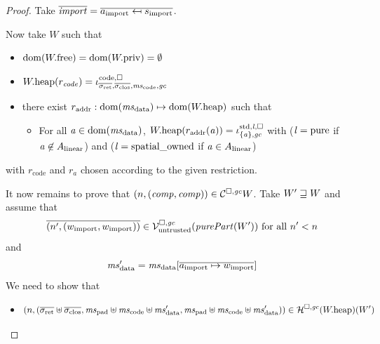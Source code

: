 \documentclass[a4paper]{article}
\begin{document}
\begin{proof}
  Take $\overline{\mathit{import}} = \overline{a_{\mathrm{import}} \mapsfrom s_{\mathrm{import}}}$.

  Now take $W$ such that
  \begin{itemize}
  \item $\mathrm{dom}(W.\mathrm{free}) = \mathrm{dom}(W.\mathrm{priv}) = \emptyset$
  \item $\pwheap(r_\code) =  \codereg[\mathrm{code},\square]{\sigrets,\sigcloss,\mscode,\gc}$
  \item there exist $r_{\mathrm{addr}} : \dom(\msdata) \mapsto \dom(\pwheap)$ such that
    \begin{itemize}
    \item For all $\aaddr\in\dom(\msdata)$, $W.\mathrm{heap}(r_{\mathrm{addr}}(\mathit{a})) = \iota^{\mathrm{std},\mathit{l},\square}_{\{\mathit{a}\},\mathit{gc}}$ with ($\mathit{l} = \mathrm{pure}$ if $\mathit{a}\not\in A_{\mathrm{linear}}$) and ($\mathit{l} = \mathrm{spatial\_owned}$ if $\mathit{a}\in A_{\mathrm{linear}}$)
    \end{itemize}
  \end{itemize}
  with $r_{\mathrm{code}}$ and $r_a$ chosen according to the given restriction.
  
  It now remains to prove that $\left(n,(\mathit{comp},\mathit{comp})\right) \in \mathcal{C}^{\square,\mathit{gc}}{W}$.
  Take $W' \sqsupseteq W$ and assume that
  \begin{equation*}
    \overline{\npair[n']{(w_{\mathrm{import}},w_{\mathrm{import}})}} \in \lrv(\purePart{W'}) \text{ for all $n' < n$}\\
  \end{equation*}
  and
  \begin{equation*}
    \msdata' = \msdata{}[\overline{a_{\mathrm{import}} \mapsto w_{\mathrm{import}}}] \\
  \end{equation*}
  We need to show that
  \begin{itemize}
  \item
    \begin{equation*}
      \npair{(\sigrets\uplus\sigcloss,\mspad\uplus\mscode\uplus \msdata', \mspad\uplus\mscode\uplus\msdata')} \in \lrheap(\pwheap)(W')
    \end{equation*}


\end{itemize}
\end{proof}
\end{document}
